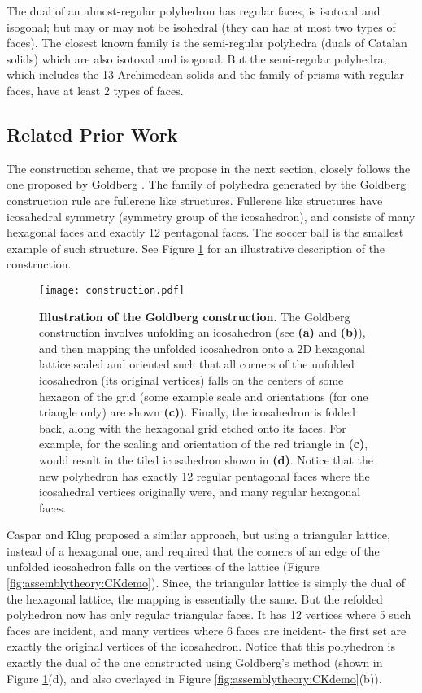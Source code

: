 \documentclass[11pt]{article}
\newcommand{\1}{\mathds{1}}
\begin{document}
The dual of an almost-regular polyhedron has regular faces, is isotoxal and isogonal; but may or may not be isohedral (they can hae at most two types of faces). The closest known family is the semi-regular polyhedra (duals of Catalan solids) which are also isotoxal and isogonal. But the semi-regular polyhedra, which includes the 13 Archimedean solids and the family of prisms with regular faces, have at least 2 types of faces.


\subsection{Related Prior Work}
The construction scheme, that we propose in the next section, closely follows the one proposed by Goldberg \cite{Goldberg_1937}. The family of polyhedra generated by the Goldberg construction rule \cite{Goldberg_1937} are fullerene like structures. Fullerene like structures have icosahedral symmetry (symmetry group of the icosahedron), and consists of many hexagonal faces and exactly 12 pentagonal faces. The soccer ball is the smallest example of such structure. See Figure \ref{fig:assemblytheory:construction} for an illustrative description of the construction.

\begin{figure}[h!]
\centering
\texttt{[image: construction.pdf]}
\caption[Illustration of the Goldberg construction]{ \textbf{Illustration of the Goldberg construction}. The Goldberg construction involves unfolding an icosahedron (see \textbf{(a)} and \textbf{(b)}), and then mapping the unfolded icosahedron onto a 2D hexagonal lattice scaled and oriented such that all corners of the unfolded icosahedron (its original vertices) falls on the centers of some hexagon of the grid (some example scale and orientations (for one triangle only) are shown \textbf{(c)}). Finally, the icosahedron is folded back, along with the hexagonal grid etched onto its faces. For example, for the scaling and orientation of the red triangle in \textbf{(c)}, would result in the tiled icosahedron shown in \textbf{(d)}. Notice that the new polyhedron has exactly 12 regular pentagonal faces where the icosahedral vertices originally were, and many regular hexagonal faces.}   
\label{fig:assemblytheory:construction}
\end{figure}

Caspar and Klug \cite{caspar62} proposed a similar approach, but using a triangular lattice, instead of a hexagonal one, and required that the corners of an edge of the unfolded icosahedron falls on the vertices of the lattice (Figure \ref{fig:assemblytheory:CKdemo}). Since, the triangular lattice is simply the dual of the hexagonal lattice, the mapping is essentially the same. But the refolded polyhedron now has only regular triangular faces. It has 12 vertices where 5 such faces are incident, and many vertices where 6 faces are incident- the first set are exactly the original vertices of the icosahedron. Notice that this polyhedron is exactly the dual of the one constructed using Goldberg's method (shown in Figure \ref{fig:assemblytheory:construction}(d), and also overlayed in Figure \ref{fig:assemblytheory:CKdemo}(b)).
\end{document}
